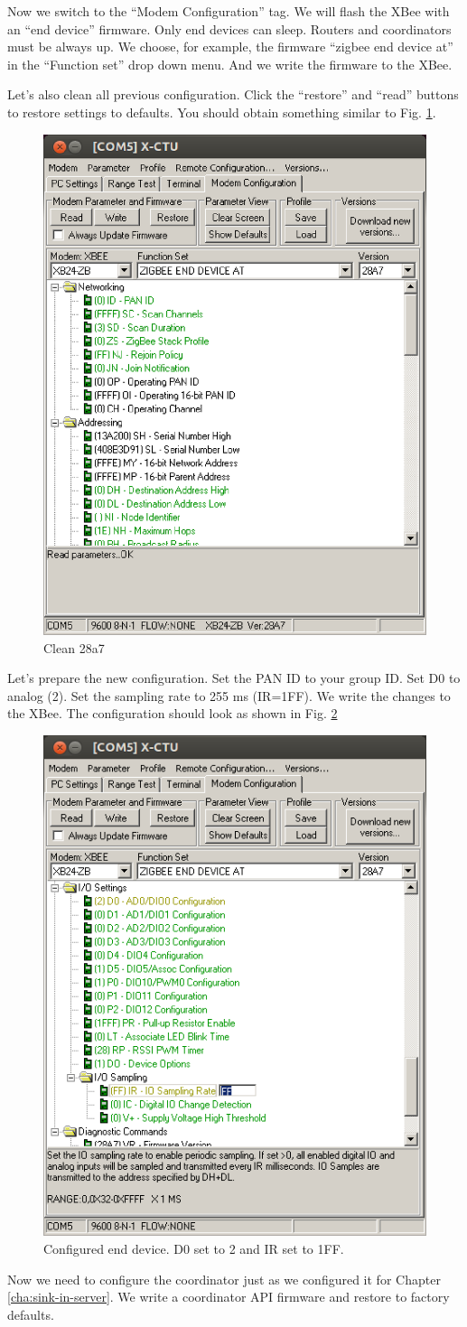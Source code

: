 Now we switch to the ``Modem Configuration'' tag.
We will flash the XBee with an ``end device'' firmware.
Only end devices can sleep.
Routers and coordinators must be always up.
We choose, for example, the firmware ``zigbee end device at'' in the ``Function set'' drop down menu.
And we write the firmware to the XBee.

Let's also clean all previous configuration.
Click the ``restore'' and ``read'' buttons to restore settings to defaults.
You should obtain something similar to Fig. \ref{fig:clean-28a7}.

\begin{figure}[htbp]
  \centering
  \includegraphics[width=0.3\linewidth]{figures/clean-28a7}
  \caption{Clean 28a7}
  \label{fig:clean-28a7}
\end{figure}

Let's prepare the new configuration.
Set the PAN ID to your group ID.
Set D0 to analog (2).
Set the sampling rate to 255 ms (IR=1FF).
We write the changes to the XBee.
The configuration should look as shown in Fig. \ref{fig:configured-end-device}

\begin{figure}[htbp]
  \centering
  \includegraphics[width=0.3\linewidth]{figures/configured-end-device}
  \caption{Configured end device. D0 set to 2 and IR set to 1FF.}
  \label{fig:configured-end-device}
\end{figure}

Now we need to configure the coordinator just as we configured it for 
Chapter \ref{cha:sink-in-server}.
We write a coordinator API firmware and restore to factory defaults.

